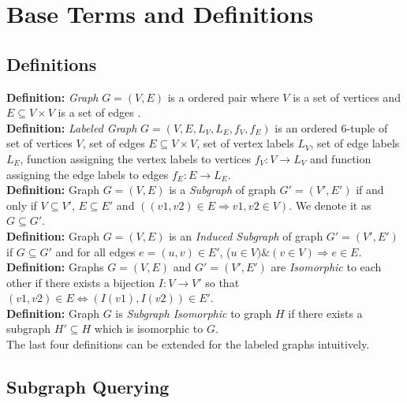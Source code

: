 \chapter{Base Terms and Definitions}

\section{Definitions}

\textbf{Definition:} \textit{Graph} $G=(V,E)$ is a ordered pair where $V$ is a set of vertices and $E \subseteq V \times V $ is a set of edges .\\

\noindent \textbf{Definition:} \textit{Labeled Graph} $G=(V,E,L_{V},L_{E},f_{V},f_{E})$ is an ordered 6-tuple of set of vertices $V$, set of edges $E \subseteq V \times V $, set of vertex labels $L_{V}$,  set of edge labels $L_{E}$, function assigning the vertex labels to vertices $f_{V}: V \longrightarrow L_{V}$ and function assigning the edge labels to edges $f_{E}: E \longrightarrow L_{E}$.\\

\noindent \textbf{Definition:} Graph $G=(V,E)$ is a \textit{Subgraph} of graph $G'=(V',E')$ if and only if $V \subseteq V'$,  $E \subseteq E'$ and $((v1, v2) \in E \Longrightarrow v1, v2 \in V)$. We denote it as $G \subseteq G'$.\\

\noindent \textbf{Definition:} Graph $G=(V,E)$ is an \textit{Induced Subgraph} of graph $G'=(V',E')$ if $G \subseteq G'$ and for all edges $e=(u,v) \in E'$, ($u \in V) \& (v \in V) \Longrightarrow e \in E$.\\

\noindent \textbf{Definition:} Graphs $G=(V,E)$ and $G'=(V',E')$ are \textit{Isomorphic} to each other if there exists a bijection $I: V \longrightarrow V'$ so that $(v1,v2) \in E \Leftrightarrow (I(v1),I(v2)) \in E'$.\\

\noindent \textbf{Definition:} Graph $G$ is \textit{Subgraph Isomorphic} to graph $H$ if there exists a subgraph $H' \subseteq H$ which is isomorphic to $G$.\\

\noindent The last four definitions can be extended for the labeled graphs intuitively. 

\section{Subgraph Querying}

